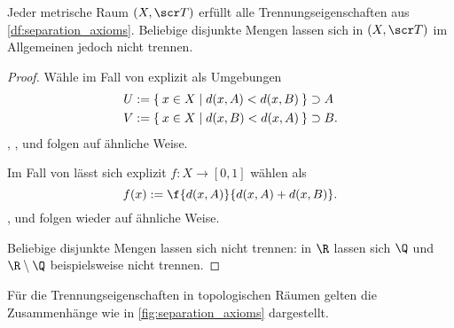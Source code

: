 \begin{nt}
	Jeder metrische Raum $(X, \scr T)$ erfüllt alle Trennungseigenschaften aus \ref{df:separation_axioms}.
	Beliebige disjunkte Mengen lassen sich in $(X, \scr T)$ im Allgemeinen jedoch nicht trennen.
	\begin{proof}
		Wähle im Fall von  explizit als Umgebungen
		\begin{align*}
			U &:= \Set{ x \in X | d(x, A) < d(x, B) } \supset A \\
			V &:= \Set{ x \in X | d(x, B) < d(x, A) } \supset B.
		\end{align*}
		, ,  und  folgen auf ähnliche Weise.

		Im Fall von  lässt sich explizit $f: X \to [0,1]$ wählen als
		\[
			f(x)
			:= \f {d(x,A)}{d(x,A) + d(x,B)}.
		\]
		,  und  folgen wieder auf ähnliche Weise.

		Beliebige disjunkte Mengen lassen sich nicht trennen:
		in $\R$ lassen sich $\Q$ und $\R \setminus \Q$ beispielsweise nicht trennen.
	\end{proof}
\end{nt}

Für die Trennungseigenschaften in topologischen Räumen gelten die Zusammenhänge wie in \ref{fig:separation_axioms} dargestellt.

